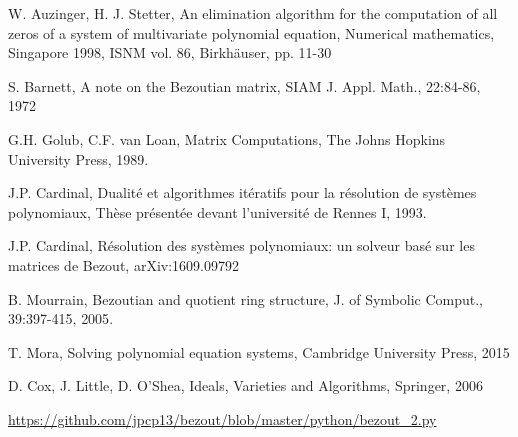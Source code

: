 \documentclass{standalone}
\begin{document}
  \begin{thebibliography}{00}

  {W. Auzinger, H. J. Stetter},
  {An elimination algorithm for the computation of all zeros of a system of multivariate polynomial equation},
  {Numerical mathematics, Singapore 1998, ISNM vol. 86, Birkhäuser, pp. 11-30}

  {S. Barnett}, {A note on the Bezoutian matrix},
  {SIAM J. Appl. Math., 22:84-86}, {1972}

  {G.H. Golub, C.F. van Loan},
  {Matrix Computations}, {The Johns Hopkins University Press}, {1989}.

  {J.P. Cardinal}, 
  {Dualit\'e et algorithmes it\'eratifs pour la r\'esolution de syst\`emes polynomiaux}, 
  {Th\`ese présent\'ee devant l'universit\'e de Rennes I}, {1993}.

  {J.P. Cardinal}, 
  {R\'esolution des syst\`emes polynomiaux: un solveur bas\'e sur les matrices de Bezout},
  {arXiv:1609.09792}
 	
  {B. Mourrain}, {Bezoutian and quotient ring structure},
  {J. of Symbolic Comput., 39:397-415}, {2005}.

  {T. Mora}, {Solving polynomial equation systems}, {Cambridge University Press}, {2015}

  {D. Cox, J. Little, D. O'Shea},
  {Ideals, Varieties and Algorithms}, {Springer}, {2006}

  \url{https://github.com/jpcp13/bezout/blob/master/python/bezout_2.py}

  \end{thebibliography}
\end{document}
